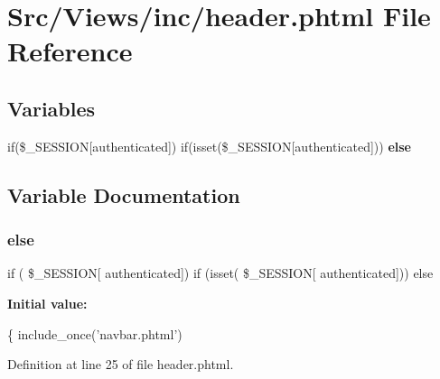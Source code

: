 \section{Src/\+Views/inc/header.phtml File Reference}
\label{header_8phtml}
\subsection*{Variables}
\begin{DoxyCompactItemize}
\item 
if(\$\+\_\+\+S\+E\+S\+S\+I\+ON[\textquotesingle{}authenticated\textquotesingle{}]) if(isset(\$\+\_\+\+S\+E\+S\+S\+I\+ON[\textquotesingle{}authenticated\textquotesingle{}])) \textbf{ else}
\end{DoxyCompactItemize}


\subsection{Variable Documentation}
\mbox{\label{header_8phtml_a1dcfa257dd0f03188ac481d49546ca80}} 
\subsubsection{else}
{\footnotesize\ttfamily if ( \$\+\_\+\+S\+E\+S\+S\+I\+ON[ \textquotesingle{}authenticated\textquotesingle{}]) if (isset( \$\+\_\+\+S\+E\+S\+S\+I\+ON[ \textquotesingle{}authenticated\textquotesingle{}])) else}

{\bfseries Initial value\+:}
\begin{DoxyCode}
\{
      include\_once(\textcolor{stringliteral}{'navbar.phtml'})
\end{DoxyCode}


Definition at line 25 of file header.\+phtml.

